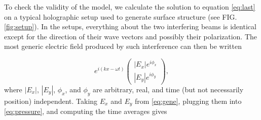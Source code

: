 \documentclass[aps, prl, twocolumn, groupedaddress]{revtex4-1}
\begin{document}

To check the validity of the model, we calculate the solution to
equation \ref{eq:last} on a typical holographic setup used to generate
surface structure (see FIG.\ref{fig:setup}).  In the setups,
everything about the two interfering beams is identical except for the
direction of their wave vectors and possibly their polarization. The
most generic electric field produced by such interference can then be
written

\begin{equation}
e^{i\left(kx-\omega t\right)} \left(
\begin{array}{c}
\left|E_x\right| e^{i\phi_x}\\
\left|E_y\right| e^{i\phi_y}
\end{array}
\right) \mathrm{,} \label{eq:gene}
\end{equation}
where $\left|E_x\right|$, $\left|E_y\right|$, $\phi_x$, and $\phi_y$  are arbitrary,
real, and time (but not necessarily position) independent. Taking $E_x$ and $E_y$ from
\ref{eq:gene}, plugging them into \ref{eq:pressure}, and computing the time averages
gives
\end{document}
